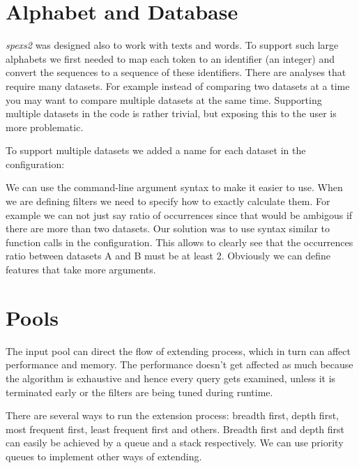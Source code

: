 \section{Alphabet and Database}

\emph{spexs2} was designed also to work with texts and words. To support such large alphabets we first needed to map each token to an identifier (an integer) and convert the sequences to a sequence of these identifiers. There are analyses that require many datasets. For example instead of comparing two datasets at a time you may want to compare multiple datasets at the same time. Supporting multiple datasets in the code is rather trivial, but exposing this to the user is more problematic.

To support multiple datasets we added a name for each dataset in the configuration:

\begin{file}
"Datasets" : {
    "A" : { "File" : "$A$" },
    "B" : { "File" : "$B$" },
    "C" : { "File" : "$C$" },
    ...
\end{file}

We can use the command-line argument syntax to make it easier to use. When we are defining filters we need to specify how to exactly calculate them. For example we can not just say ratio of occurrences since that would be ambigous if there are more than two datasets. Our solution was to use syntax similar to function calls in the configuration. This allows to clearly see that the occurrences ratio between datasets A and B must be at least 2. Obviously we can define features that take more arguments.

\begin{file}
...
"Extension": {
    "Outputtable": {
        "OccurencesRatio(A, B)" : {"min" : 2},
        ...
\end{file}

\section{Pools}

The input pool can direct the flow of extending process, which in turn can affect performance and memory. The performance doesn't get affected as much because the algorithm is exhaustive and hence every query gets examined, unless it is terminated early or the filters are being tuned during runtime.

There are several ways to run the extension process: breadth first, depth first, most frequent first, least frequent first and others. Breadth first and depth first can easily be achieved by a queue and a stack respectively. We can use priority queues to implement other ways of extending.

